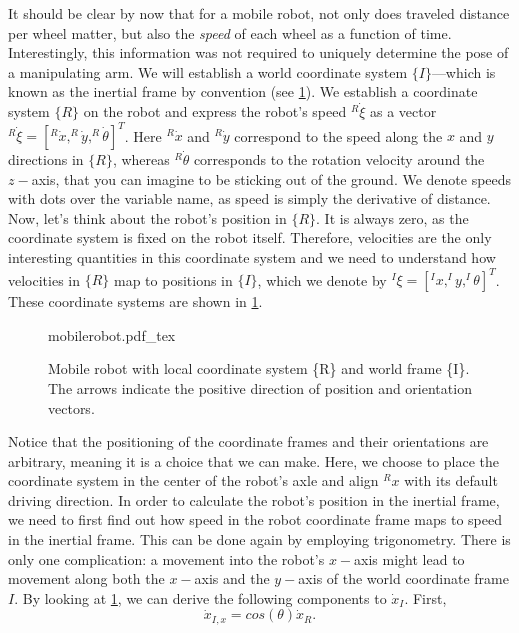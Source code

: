 It should be clear by now that for a mobile robot, not only does traveled distance per wheel matter, but also the \textsl{speed} of each wheel as a function of time.
Interestingly, this information was not required to uniquely determine the pose of a manipulating arm.
We will establish a world coordinate system $\{I\}$---which is known as the inertial frame by convention (see \cref{fig:mobilerobot}).
We establish a coordinate system $\{R\}$ on the robot and express the robot's speed $^R\dot{\xi}$ as a vector $ ^R\dot{\xi}=[^R\dot{x}, ^R\dot{y}, ^R\dot{\theta}]^T$. Here $^R\dot{x}$ and $^R\dot{y}$ correspond to the speed along the $x$ and $y$ directions in $\{R\}$, whereas $^R\dot{\theta}$ corresponds to the rotation velocity around the $z-$axis, that you can imagine to be sticking out of the ground.
We denote speeds with dots over the variable name, as speed is simply the derivative of distance.
Now, let's think about the robot's position in $\{R\}$. It is always zero, as the coordinate system is fixed on the robot itself.
Therefore, velocities are the only interesting quantities in this coordinate system and we need to understand how velocities in $\{R\}$ map to positions in $\{I\}$, which we denote by $^I\xi=[^Ix, ^Iy, ^I\theta]^T$. These coordinate systems are shown in \cref{fig:mobilerobot}.

\begin{figure}[htb!]
    \centering
    \def\svgwidth{0.85\textwidth}
    {mobilerobot.pdf_tex}
    \caption{Mobile robot with local coordinate system \{R\} and world frame \{I\}. The arrows indicate the positive direction of position and orientation vectors.}
    \label{fig:mobilerobot}
\end{figure}

Notice that the positioning of the coordinate frames and their orientations are arbitrary, meaning it is a choice that we can make. Here, we choose to place the coordinate system in the center of the robot's axle and align $^Rx$ with its default driving direction.
In order to calculate the robot's position in the inertial frame, we need to first find out how speed in the robot coordinate frame maps to speed in the inertial frame.
This can be done again by employing trigonometry. There is only one complication: a movement into the robot's $x-$axis might lead to movement along both the $x-$axis and the $y-$axis of the world coordinate frame ${I}$. By looking at \cref{fig:mobilerobot}, we can derive the following components to $\dot{x}_I$. First,
\begin{equation}
\dot{x}_{I,x}=cos(\theta) \dot{x}_R.
\end{equation}

